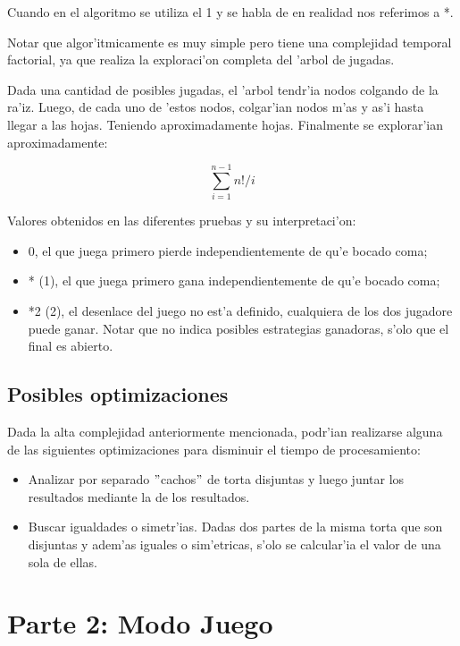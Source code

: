 \documentclass[spanish, a4paper, 10pt, titlepage]{article}
\begin{document}
Cuando en el algoritmo se utiliza el 1 y se habla de  en realidad nos referimos a *.

Notar que algor'itmicamente es muy simple pero tiene una complejidad temporal factorial, ya que realiza la exploraci'on completa del 'arbol de jugadas.

Dada una cantidad  de posibles jugadas, el 'arbol tendr'ia  nodos colgando de la ra'iz. Luego, de cada uno de 'estos nodos, colgar'ian  nodos m'as y as'i hasta llegar a las hojas. Teniendo aproximadamente  hojas. Finalmente se explorar'ian aproximadamente:

$$\sum_{i=1}^{n-1}{n!/i}$$

Valores obtenidos en las diferentes pruebas y su interpretaci'on:
\begin{itemize}
\item 0, el que juega primero pierde independientemente de qu'e bocado coma;
\item * (1), el que juega primero gana independientemente de qu'e bocado coma;
\item *2 (2), el desenlace del juego no est'a definido, cualquiera de los dos jugadore puede ganar. Notar que no indica posibles estrategias ganadoras, s'olo que el final es abierto.

\end{itemize}

\subsection{Posibles optimizaciones}

Dada la alta complejidad anteriormente mencionada, podr'ian realizarse alguna de las siguientes optimizaciones para disminuir el tiempo de procesamiento:

\begin{itemize}
\item Analizar por separado $"$cachos$"$ de torta disjuntas y luego juntar los resultados mediante la  de los resultados.
\item Buscar igualdades o simetr'ias. Dadas dos partes de la misma torta que son disjuntas y adem'as iguales o sim'etricas, s'olo se calcular'ia el valor de una sola de ellas.
\end{itemize}


\clearpage

\section{Parte 2: Modo Juego}
\end{document}
